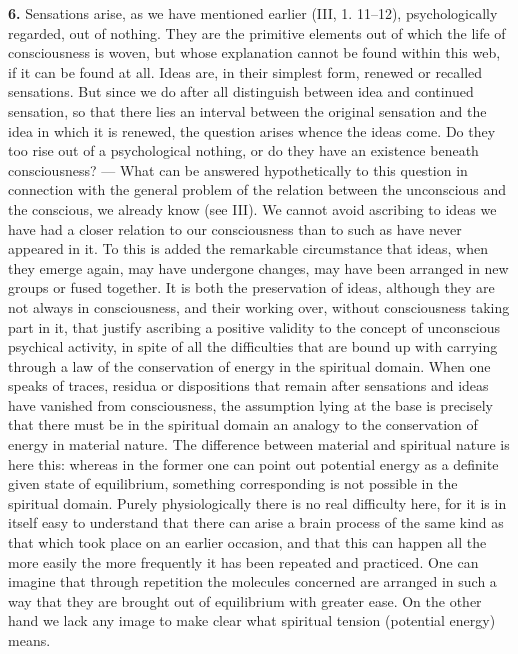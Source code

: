 \documentclass[12pt,a4paper]{book}
\newcommand{\opage}[1]{\marginnote{\footnotesize\textit{[#1]}}}
\begin{document}
\textbf{6.} Sensations arise, as we have mentioned earlier (III, 1.
11--12), psychologically regarded, out of nothing. They are the primitive
elements out of which the life of consciousness is woven, but whose
explanation cannot be found within this web, if it can be found at all.
Ideas are, in their simplest form, renewed or recalled sensations. But
since we do after all distinguish between idea and continued sensation,
so that there lies an interval between the original sensation and the
idea in which it is renewed, the question arises whence the ideas come. Do
they too rise out of a psychological nothing, or do they have an
existence beneath consciousness? --- What can be answered hypothetically
to this question in connection with the general problem of the relation
between the unconscious and the conscious, we already know (see III). We
cannot avoid ascribing to ideas we have had a closer relation to our
consciousness than to such as have never appeared in it. To this is added
the remarkable circumstance that ideas, when they emerge again, may have
undergone changes, may have been arranged in new groups or fused
together. It is both the preservation of ideas, although they are not
always in consciousness, and their working over, without consciousness
taking part in it, that justify ascribing a positive validity to the
concept of unconscious psychical activity, in spite of all the
difficulties that are bound up with carrying through a law of the
conservation of energy in the spiritual domain. When one speaks of
traces, residua or dispositions that remain after sensations and ideas
have vanished from consciousness, the assumption lying at the base is
precisely that there must be in the spiritual domain an analogy to the
conservation of energy in material nature. The difference between material
and spiritual nature is here this: whereas in the former one can point out
potential energy as a definite given state of equilibrium, something
corresponding is not possible in the spiritual
\opage{173}domain. Purely physiologically there is no real difficulty here,
for it is in itself easy to understand that there can arise a brain
process of the same kind as that which took place on an earlier occasion,
and that this can happen all the more easily the more frequently it has
been repeated and practiced. One can imagine that through repetition the
molecules concerned are arranged in such a way that they are brought out
of equilibrium with greater ease. On the other hand we lack any image to
make clear what spiritual tension (potential energy) means.
\end{document}
